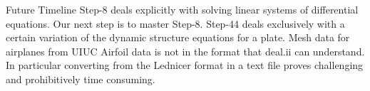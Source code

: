 \documentclass{beamer}
\begin{document}
\begin{frame}{Future Timeline}
    Step-8 deals explicitly with solving linear systems of differential equations. Our next step is to master Step-8. 
    \newline
    \newline
    Step-44 deals exclusively with a certain variation of the dynamic structure equations for a plate. 
    \newline
    \newline
    Mesh data for airplanes from UIUC Airfoil data is not in the format that deal.ii can understand. In particular converting from the Lednicer format in a text file proves challenging and prohibitively time consuming. 
\end{frame}
\end{document}
